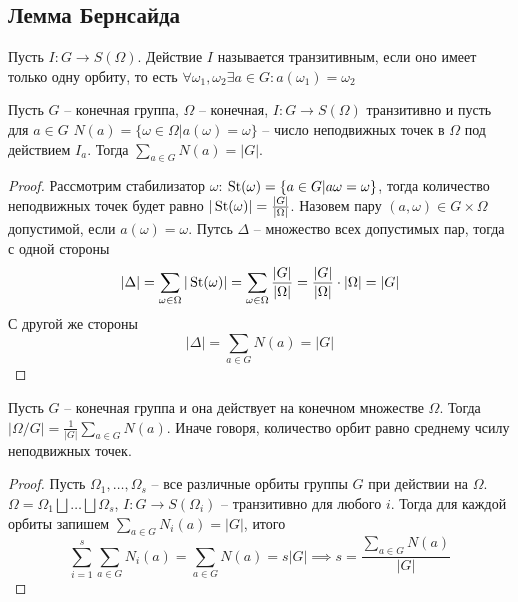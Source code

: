 
\subsection{Лемма Бернсайда}
\begin{definition}
    Пусть $I: G \to S(\Omega)$. Действие $I$ называется транзитивным, если оно имеет только одну орбиту, то есть $\forall \omega_1, \omega_2 \exists a \in G: a(\omega_1) = \omega_2$
\end{definition}

\begin{theorem}
    Пусть $G$ -- конечная группа, $\Omega$ -- конечная, $I: G \to S(\Omega)$ транзитивно и пусть для $a \in G$ $N(a) = \{ \omega \in \Omega | a(\omega) = \omega \}$ -- число неподвижных точек в $\Omega$ под действием $I_a$. Тогда $\sum\limits_{a \in G} N(a) = |G|$.
\end{theorem}

\begin{proof}
    Рассмотрим стабилизатор $\omega$: $\operatorname{\text{St}}(\omega) = \{ a \in G | a \omega = \omega \}$, тогда количество неподвижных точек будет равно $|\operatorname{\text{St}}(\omega)| = \frac{|G|}{|\Omega|}$. Назовем пару $(a, \omega) \in G \times \Omega$ допустимой, если $a(\omega) = \omega$. Путсь $\Delta$ -- множество всех допустимых пар, тогда с одной стороны
    $$|\Delta| = \sum\limits_{\omega \in \Omega} |\operatorname{\text{St}}(\omega)| = \sum\limits_{\omega \in \Omega} \frac{|G|}{|\Omega|} = \frac{|G|}{|\Omega|} \cdot |\Omega| = |G|$$
    С другой же стороны 
    $$|\Delta| = \sum\limits_{a \in G} N(a) = |G|$$
\end{proof}

\begin{corollary}
    Пусть $G$ -- конечная группа и она действует на конечном множестве $\Omega$. Тогда $|\Omega/G| = \frac{1}{|G|} \sum\limits_{a \in G} N(a)$. Иначе говоря, количество орбит равно среднему чсилу неподвижных точек.
\end{corollary}

\begin{proof}
    Пусть $\Omega_1, \dots, \Omega_s$ -- все различные орбиты группы $G$ при действии на $\Omega$. \\
    $\Omega = \Omega_1 \bigsqcup \dots \bigsqcup \Omega_s$, $I: G \to S(\Omega_i)$ -- транзитивно для любого $i$. Тогда для каждой орбиты запишем $\sum\limits_{a \in G} N_i(a) = |G|$, итого
    $$\sum\limits_{i = 1}^s\sum\limits_{a \in G} N_i(a) = \sum\limits_{a \in G} N(a) = s|G| \implies s = \frac{\sum\limits_{a \in G} N(a)}{|G|}$$
\end{proof}

